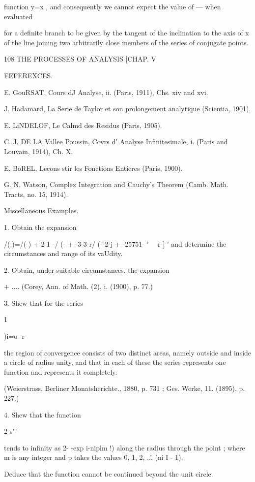 {{{{function y=x , and consequently we cannot expect the value of — when evaluated 

for a definite branch to be given by the tangent of the inclination to the axis of x of the 
line joining two arbitrarily close members of the series of conjugate points. 



108 THE PROCESSES OF ANALYSIS [CHAP. V 

EEFEREXCES. 

E. GouRSAT, Cours dJ Analyse, ii. (Paris, 1911), Chs. xiv and xvi. 

J. Hadamard, La Serie de Taylor et son prolongement analytique (Scientia, 1901). 

E. LiNDELOF, Le Calmd des Residus (Paris, 1905). 

C. J. DE LA Vallee Poussin, Covrs d' Analyse Infinitesimale, i. (Paris and Louvain, 
1914), Ch. X. 

E. BoREL, Lecons stir les Fonctions Entieres (Paris, 1900). 

G. N. Watson, Complex Integration and Cauchy's Theorem (Camb. Math. Tracts, 
no. 15, 1914). 

Miscellaneous Examples. 

1. Obtain the expansion 

/(.)=/( ) + 2 1 -/ (-  + -3-3-r/ ( -2-j + -25751- ' \ \  r-] ' 
and determine the circumstances and range of its vaUdity. 

2. Obtain, under suitable circumstances, the expansion 

+ .... (Corey, Ann. of Math. (2), i. (1900), p. 77.) 

3. Shew that for the series 

  1 



)i=o   -r~ 

the region of convergence consists of two distinct areas, namely outside and inside a circle 
of radius unity, and that in each of these the series represents one function and represents 
it completely. 

(Weierstrass, Berliner Monatsherichte., 1880, p. 731 ; Ges. Werke, 11. (1895), p. 227.) 

4. Shew that the function 

2 s"' 

tends to infinity as 2- -exp  i-niplm !) along the radius through the point ; where m is any 
integer and p takes the values 0, 1, 2, ..'. (ni I - 1). 

Deduce that the function cannot be continued beyond the unit circle. 

}}}}
